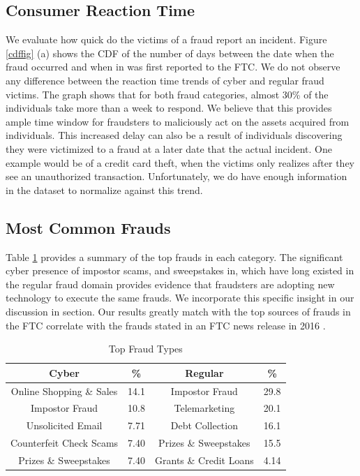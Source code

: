 \documentclass[conference]{IEEEtran}
\begin{document}
\subsection{Consumer Reaction Time}\label{fraudsters}

We evaluate how quick do the victims of a fraud report an incident. Figure \ref{cdffig} (a) shows the CDF of the number of days between the date when the fraud occurred and when in was first reported to the FTC. We do not observe any difference between the reaction time trends of cyber and regular fraud victims. The graph shows that for both fraud categories, almost 30\% of the individuals take more than a week to respond. We believe that this provides ample time window for fraudsters to maliciously act on the assets acquired from individuals. This increased delay can also be a result of individuals discovering they were victimized to a fraud at a later date that the actual incident. One example would be of a credit card theft, when the victims only realizes after they see an unauthorized transaction. Unfortunately, we do have enough information in the dataset to normalize against this trend.

\subsection{Most Common Frauds}\label{fraudsters}

Table \ref{topfrauds} provides a summary of the top frauds in each category. The significant cyber presence of impostor scams, and sweepstakes in, which have long existed in the regular fraud domain provides evidence that fraudsters are adopting new technology to execute the same frauds. We incorporate this specific insight in our discussion in section. Our results greatly match with the top sources of frauds in the FTC correlate with the frauds stated in an FTC news release in 2016 \cite{ftcpress2016}. 

\begin{table}[h]
\centering
\begin{tabular}{c|c||c|c}
\hline
\bfseries Cyber & \bfseries \% & \bfseries Regular & \bfseries \% \\
\hline
\hline
Online Shopping \& Sales & 14.1 & Impostor Fraud & 29.8\\
\hline
Impostor Fraud & 10.8 & Telemarketing & 20.1\\
\hline
Unsolicited Email & 7.71 & Debt Collection & 16.1\\
\hline
Counterfeit Check Scams	 & 7.40 & Prizes \& Sweepstakes & 15.5 \\
\hline
Prizes \& Sweepstakes & 7.40 & Grants \& Credit Loans & 4.14\\
\hline
\hline
\end{tabular}
\vspace{8pt}
\caption{Top Fraud Types}\label{topfrauds}
\vspace{-15pt}
\end{table}
\end{document}
